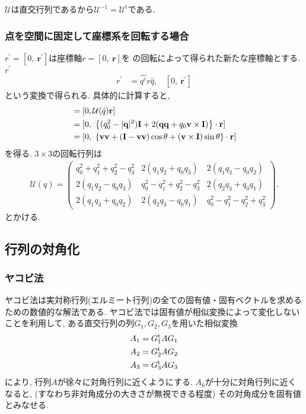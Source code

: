 $\mathcal{U}$は直交行列であるから$\mathcal{U}^{-1} = \mathcal{U}^{\mathrm{t}}$である.

\subsubsection{点を空間に固定して座標系を回転する場合}
$r^{\prime}=[0,~ \mathbf{r}^{\prime}]$は座標軸$r=[0,~ \mathbf{r}]$を
の回転によって得られた新たな座標軸とする. $r^{\prime}$
\begin{align}
 r^{\prime} &= \hat{q^{\mathrm{c}}} r \hat{q}
 ,~~~~
 [0,~ \mathbf{r}^{\prime}]
\end{align}
という変換で得られる. 具体的に計算すると,
\begin{align}
  [0,~ \mathbf{r}^{\prime}]
&=
  [0, \mathcal{U}(\hat{q}) \mathbf{r}]
 \notag
 \\
&=
 [0,~ \left\{
          (q_{0}^{2}  - |\mathbf{q}|^{2}) \mathbf{I}
        + 2(\mathbf{qq} + q_{0}\mathbf{v} \times \mathbf{I})
     \right\}
     \cdot \mathbf{r}
 ]
 \\
&=
  [0,~ 
   \{\mathbf{vv} + (\mathbf{I} - \mathbf{vv}) \cos \theta + (\mathbf{v} \times \mathbf{I}) \sin \theta\} \cdot \mathbf{r}]
\end{align}
を得る. $3 \times 3$の回転行列は
\begin{align}
 \mathcal{U}(q)
=
 \left(
   \begin{array}{ccc}
      q_{0}^{2} + q_{1}^{2} + q_{2}^{2} - q_{3}^{2} 
    & 2(q_{1} q_{2} + q_{0} q_{3})
    & 2(q_{1} q_{3} - q_{0} q_{2})
    \\
      2(q_{1} q_{2} - q_{0} q_{3})
    & q_{0}^{2} - q_{1}^{2} + q_{2}^{2} - q_{3}^{2} 
    & 2(q_{2} q_{3} + q_{0} q_{1})
    \\
      2(q_{1} q_{3} + q_{0} q_{2})
    & 2(q_{2} q_{3} - q_{0} q_{1})
    & q_{0}^{2} - q_{1}^{2} - q_{2}^{2} + q_{3}^{2} 
   \end{array}
\right).
\end{align}
とかける.

\subsection{行列の対角化}
\subsubsection{ヤコビ法\cite{2019Kaneda}}
ヤコビ法は実対称行列(エルミート行列)の全ての固有値・固有ベクトルを求めるための数値的な解法である.
ヤコビ法では固有値が相似変換によって変化しないことを利用して,
ある直交行列の列$G_{1}, G_{2}, G_{3}$を用いた相似変換
\begin{align}
 A_{1} &= G_{1}^{\mathrm{t}} A G_{1} \notag \\
 A_{2} &= G_{2}^{\mathrm{t}} A G_{2} \notag \\
 A_{3} &= G_{3}^{\mathrm{t}} A G_{3} \notag 
\end{align}
により, 行列$A$が徐々に対角行列に近くようにする.
$A_{k}$が十分に対角行列に近くなると, (すなわち非対角成分の大きさが無視できる程度)
その対角成分を固有値とみなせる.

